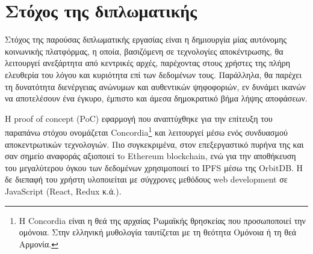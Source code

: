 \section{Στόχος της διπλωματικής}\label{section:1-4-thesis-goal}

Στόχος της παρούσας διπλωματικής εργασίας είναι η δημιουργία μίας αυτόνομης κοινωνικής πλατφόρμας, η οποία, βασιζόμενη σε τεχνολογίες αποκέντρωσης, θα λειτουργεί ανεξάρτητα από κεντρικές αρχές, παρέχοντας στους χρήστες της πλήρη ελευθερία του λόγου και κυριότητα επί των δεδομένων τους. Παράλληλα, θα παρέχει τη δυνατότητα διενέργειας ανώνυμων και αυθεντικών ψηφοφοριών, εν δυνάμει ικανών να αποτελέσουν ένα έγκυρο, έμπιστο και άμεσα δημοκρατικό βήμα λήψης αποφάσεων.

Η proof of concept (PoC) εφαρμογή που αναπτύχθηκε για την επίτευξη του παραπάνω στόχου ονομάζεται Concordia\footnote{Η Concordia είναι η θεά της αρχαίας Ρωμαϊκής θρησκείας που προσωποποιεί την ομόνοια. Στην ελληνική μυθολογία ταυτίζεται με τη θεότητα Ομόνοια ή τη θεά Αρμονία.} και λειτουργεί μέσω ενός συνδυασμού αποκεντρωτικών τεχνολογιών. Πιο συγκεκριμένα, στον επεξεργαστικό πυρήνα της και σαν σημείο αναφοράς αξιοποιεί τo Ethereum blockchain, ενώ για την αποθήκευση του μεγαλύτερου όγκου των δεδομένων χρησιμοποιεί το IPFS μέσω της OrbitDB. Η δε διεπαφή του χρήστη υλοποιείται με σύγχρονες μεθόδους web development σε JavaScript (React, Redux κ.ά.).

